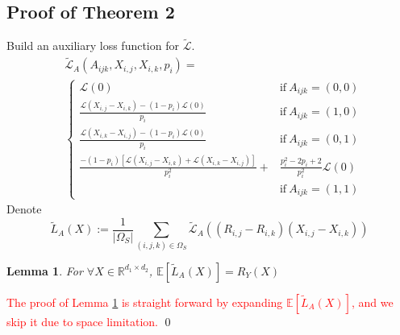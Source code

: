 \documentclass[conference]{IEEEtran}
\numberwithin{equation}{section}
\newcommand{\red}[1]{\textcolor{red}{#1}}
\newcommand{\R}{\mathbb{R}}
\newtheorem{lemma}{Lemma}
\newtheorem{sampling strategy}{Sampling Strategy}
\begin{document}
\subsection*{Proof of Theorem 2}

Build an auxiliary loss function for $\tilde{\mathcal{L}}$.
\begin{equation}
    \begin{aligned}
        & \tilde{\mathcal{L}}_A(A_{ijk}, X_{i,j}, X_{i,k}, p_i) =  \\
        &\begin{cases}
             \mathcal{L}(0) & \text{if}~ A_{ijk} = (0,0) \\
             \frac{ \mathcal{L}(X_{i,j} - X_{i,k}) - (1-p_i) \mathcal{L}(0)  }{p_i} &  \text{if}~ A_{ijk} = (1,0) \\
             \frac{ \mathcal{L}(X_{i,k} - X_{i,j}) - (1-p_i) \mathcal{L}(0) }{p_i} &  \text{if}~ A_{ijk} = (0,1) \\
             \frac{ -(1-p_i)[\mathcal{L}(X_{i,j} - X_{i,k}) + \mathcal{L}(X_{i,k} - X_{i,j})  ] }{p_i^2}
             + & \frac{p_i^2 - 2p_i + 2}{p_i^2} \mathcal{L}(0) \\  & \text{if}~ A_{ijk} = (1,1)
        \end{cases}
    \end{aligned}
    \label{eq:modifiedloss}
\end{equation}
Denote 
$$\tilde{L}_A(X) := \frac{1}{|\Omega_S|} \sum_{(i,j,k) \in \Omega_S}  \tilde{\mathcal{L}}_A( (R_{i,j} - R_{i,k})(X_{i,j} - X_{i,k}) )$$

\begin{lemma}
For $\forall X \in \R^{d_1 \times d_2}$, $\mathbb{E}[\tilde{L}_A(X)] = R_Y(X) $
\label{lemma:exp}
\end{lemma}

\red{The proof of Lemma \ref{lemma:exp} is straight forward by expanding $\mathbb{E}[\tilde{L}_A(X)]$, and we skip it due to space limitation. } \qed
\end{document}
